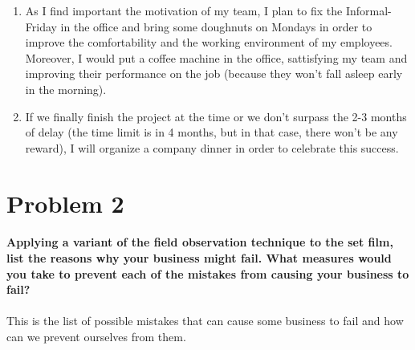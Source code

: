 \documentclass{article}
\begin{document}
\begin{enumerate}
\item As I find important the motivation of my team, I plan to fix the Informal-Friday in the office and bring some doughnuts on Mondays in order to improve the comfortability and the working environment of my employees. Moreover, I would put a coffee machine in the office, sattisfying my team and improving their performance on the job (because they won't fall asleep early in the morning).

\item If we finally finish the project at the time or we don't surpass the 2-3 months of delay (the time limit is in 4 months, but in that case, there won't be any reward), I will organize a company dinner in order to celebrate this success.

\end{enumerate}

\newpage
\section{Problem 2}

\paragraph{Applying a variant of the field observation technique to the set film, list the reasons why your business might fail. What measures would you take to prevent each of the mistakes from causing your business to fail?}
\paragraph{}

This is the list of possible mistakes that can cause some business to fail and how can we prevent ourselves from them.
\end{document}

